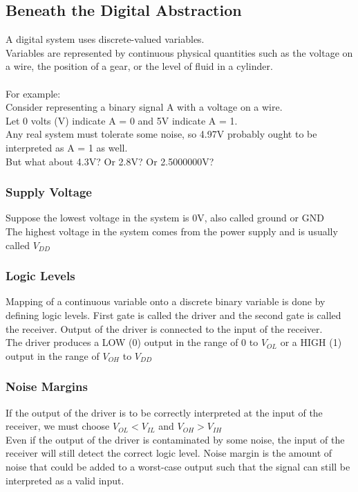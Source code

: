 \documentclass[12pt]{article}
\theoremstyle{definition}
\begin{document}
  \subsection{Beneath the Digital Abstraction}
  A digital system uses discrete-valued variables. \\
  Variables are represented by continuous physical quantities such as the voltage on a wire, the position of a gear, or the level of fluid in a cylinder. \\ \\
  For example: \\
  Consider representing a binary signal A with a voltage on a wire. \\
  Let 0 volts (V) indicate A = 0 and 5V indicate A = 1. \\
  Any real system must tolerate some noise, so 4.97V probably ought to be interpreted as A = 1 as well. \\
  But what about 4.3V? Or 2.8V? Or 2.5000000V?

  \subsubsection{Supply Voltage}
  Suppose the lowest voltage in the system is 0V, also called ground or GND \\
  The highest voltage in the system comes from the power supply and is usually called $V_{DD}$

  \subsubsection{Logic Levels}
  Mapping of a continuous variable onto a discrete binary variable is done by defining logic levels.
  First gate is called the driver and the second gate is called the receiver.
  Output of the driver is connected to the input of the receiver. \\
  The driver produces a LOW (0) output in the range of 0 to $V_{OL}$ or a HIGH (1) output in the range of $V_{OH}$ to $V_{DD}$

  \subsubsection{Noise Margins}
  If the output of the driver is to be correctly interpreted at the input of the receiver, we must choose $V_{OL} < V_{IL}$ and $V_{OH} > V_{IH}$ \\
  Even if the output of the driver is contaminated by some noise, the input of the receiver will still detect the correct logic level.
  Noise margin is the amount of noise that could be added to a worst-case output such that the signal can still be interpreted as a valid input.
\end{document}
